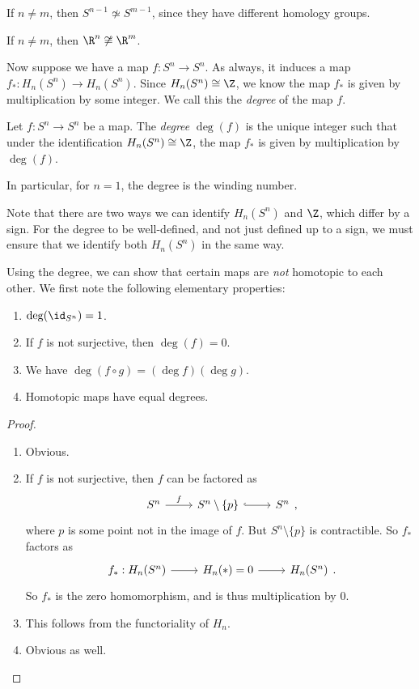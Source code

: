 \documentclass[a4paper]{article}
\theoremstyle{definition}
\begin{document}
\begin{cor}
  If $n \not= m$, then $S^{n - 1} \not\simeq S^{m - 1}$, since they have different homology groups.
\end{cor}

\begin{cor}
  If $n \not= m$, then $\R^n \not \cong \R^m$.
\end{cor}

Now suppose we have a map $f: S^n \to S^n$. As always, it induces a map $f_*: H_n(S^n) \to H_n(S^n)$. Since $H_n (S^n) \cong \Z$, we know the map $f_*$ is given by multiplication by some integer. We call this the \emph{degree} of the map $f$.
\begin{defi}
  Let $f: S^n \to S^n$ be a map. The \emph{degree} $\deg(f)$ is the unique integer such that under the identification $H_n(S^n) \cong \Z$, the map $f_*$ is given by multiplication by $\deg(f)$.
\end{defi}
In particular, for $n = 1$, the degree is the winding number.

Note that there are two ways we can identify $H_n(S^n)$ and $\Z$, which differ by a sign. For the degree to be well-defined, and not just defined up to a sign, we must ensure that we identify both $H_n(S^n)$ in the same way.

Using the degree, we can show that certain maps are \emph{not} homotopic to each other. We first note the following elementary properties:
\begin{prop}\leavevmode
  \begin{enumerate}
    \item $\deg(\id_{S^n}) = 1$.
    \item If $f$ is not surjective, then $\deg(f) = 0$.
    \item We have $\deg(f\circ g) = (\deg f)(\deg g)$.
    \item Homotopic maps have equal degrees.
  \end{enumerate}
\end{prop}

\begin{proof}\leavevmode
  \begin{enumerate}
    \item Obvious.
    \item If $f$ is not surjective, then $f$ can be factored as
      \[
        \begin{tikzcd}
          S^n \ar[r, "f"] & S^n \setminus \{p\} \ar[r, hook] & S^n
        \end{tikzcd},
      \]
      where $p$ is some point not in the image of $f$. But $S^n \setminus \{p\}$ is contractible. So $f_*$ factors as
      \[
        \begin{tikzcd}
          f_*: H_n(S^n) \ar[r] & H_n(*) = 0 \ar[r] & H_n(S^n)
        \end{tikzcd}.
      \]
      So $f_*$ is the zero homomorphism, and is thus multiplication by $0$.
    \item This follows from the functoriality of $H_n$.
    \item Obvious as well.
  \end{enumerate}
\end{proof}
\end{document}
